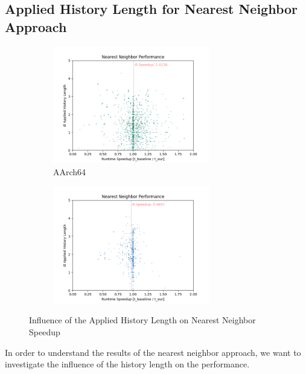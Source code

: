 \subsection{Applied History Length for Nearest Neighbor Approach}
\label{sec:eval:hist-length-vs-perf}
\begin{figure}
    \begin{subfigure}{\textwidth}
        \centering
        \includegraphics[width=0.75\textwidth]{img/nearest-neighbor/rpi_nn_scatter_no_outliers.png}
        \caption{AArch64}
        \label{fig:eval:nn-hist:pi}
    \end{subfigure}
    \vfill
    \begin{subfigure}{\textwidth}
        \centering
        \includegraphics[width=0.75\textwidth]{img/nearest-neighbor/aurora_nn_scatter_no_outliers.png}
        \caption{\aurora}
        \label{fig:eval:nn-hist:aurora}
    \end{subfigure}
    \caption{Influence of the Applied History Length on Nearest Neighbor Speedup}
    \label{fig:eval:nn-hist}
\end{figure}
In order to understand the results of the nearest neighbor approach, we want to investigate the influence of the history length on the performance.
